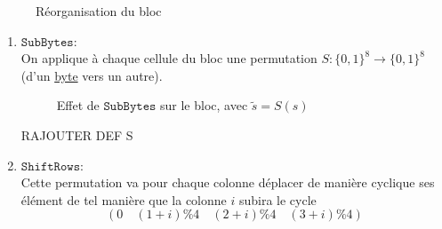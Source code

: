 \documentclass[a4paper, 12pt]{article}
\begin{document}
\begin{figure}[h]
\centering
{}
\caption{Réorganisation du bloc}
\label{reorg_entre}
\end{figure}

\begin{enumerate}
	\item $\mathtt{SubBytes}$: \\
		On applique à chaque cellule du bloc une permutation $S: \{0,1\}^8 \rightarrow \{0,1\}^8$ (d'un \hyperref[byte]{byte} vers un autre).

		\begin{figure}[h]
		\centering
		\caption{Effet de $\mathtt{SubBytes}$ sur le bloc, avec $\tilde{s} = S(s)$}
		\label{illu_subbyte}
		\end{figure}

		\begin{center}RAJOUTER DEF S\end{center}

	\item $\mathtt{ShiftRows}$: \\
		Cette permutation va pour chaque colonne déplacer de manière cyclique ses élément de tel manière que la colonne $i$ subira le cycle $$\left(0 \quad (1+i)\%4 \quad (2+i)\%4 \quad (3+i)\%4\right)$$


\end{enumerate}
\end{document}
